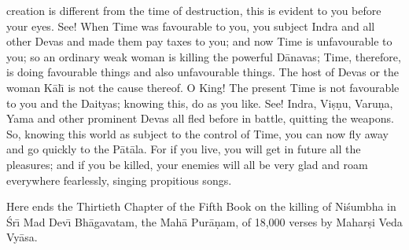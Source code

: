 creation is different from the time of destruction, this is evident to you before your eyes. See! When Time was favourable to you, you subject Indra and all other Devas and made them pay taxes to you; and now Time is unfavourable to you; so an ordinary weak woman is killing the powerful D\=anavas; Time, therefore, is doing favourable things and also unfavourable things. The host of Devas or the woman K\=al\={\i} is not the cause thereof. O King! The present Time is not favourable to you and the Daityas; knowing this, do as you like. See! Indra, Vi\d{s}\d{n}u, Varu\d{n}a, Yama and other prominent Devas all fled before in battle, quitting the weapons. So, knowing this world as subject to the control of Time, you can now fly away and go quickly to the P\=at\=ala. For if you live, you will get in future all the pleasures; and if you be killed, your enemies will all be very glad and roam everywhere fearlessly, singing propitious songs.

Here ends the Thirtieth Chapter of the Fifth Book on the killing of Ni\'sumbha in \'Sr\={\i} Mad Dev\={\i} Bh\=agavatam, the Mah\=a Pur\=a\d{n}am, of 18,000 verses by Mahar\d{s}i Veda Vy\=asa.



